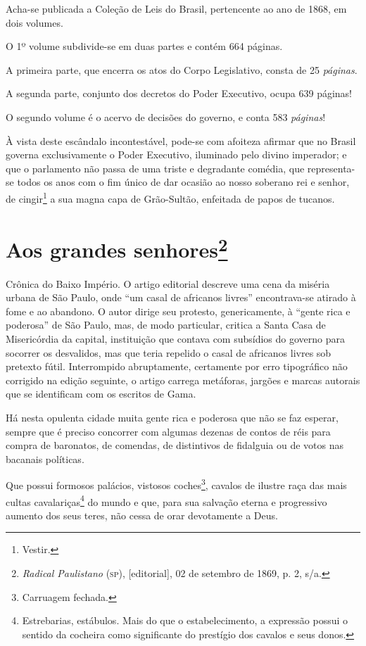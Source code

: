 Acha-se publicada a Coleção de Leis do Brasil, pertencente ao ano de
1868, em dois volumes.

O 1º volume subdivide-se em duas partes e contém 664 páginas.

A primeira parte, que encerra os atos do Corpo Legislativo, consta de 25
\emph{páginas}.

A segunda parte, conjunto dos decretos do Poder Executivo, ocupa 639
páginas!

O segundo volume é o acervo de decisões do governo, e conta 583
\emph{páginas}!

À vista deste escândalo incontestável, pode-se com afoiteza afirmar que
no Brasil governa exclusivamente o Poder Executivo, iluminado pelo
divino imperador; e que o parlamento não passa de uma triste e
degradante comédia, que representa-se todos os anos com o fim único de
dar ocasião ao nosso soberano rei e senhor, de cingir\footnote{Vestir.}
a sua magna capa de Grão-Sultão, enfeitada de papos de tucanos.

\chapter{Aos grandes senhores\footnote{\emph{Radical Paulistano} (\textsc{sp}),
  {[}editorial{]}, 02 de setembro de 1869, p. 2, s/a.}}

\begin{didascalia}
Crônica do Baixo Império. O artigo editorial descreve uma cena da
miséria urbana de São Paulo, onde ``um casal de africanos livres''
encontrava-se atirado à fome e ao abandono. O autor dirige seu protesto,
genericamente, à ``gente rica e poderosa'' de São Paulo, mas, de modo
particular, critica a Santa Casa de Misericórdia da capital, instituição
que contava com subsídios do governo para socorrer os desvalidos, mas
que teria repelido o casal de africanos livres sob pretexto fútil.
Interrompido abruptamente, certamente por erro tipográfico não corrigido
na edição seguinte, o artigo carrega metáforas, jargões e marcas
autorais que se identificam com os escritos de Gama.
\end{didascalia}



Há nesta opulenta cidade muita gente rica e poderosa que não se faz
esperar, sempre que é preciso concorrer com algumas dezenas de contos de
réis para compra de baronatos, de comendas, de distintivos de fidalguia
ou de votos nas bacanais políticas.

Que possui formosos palácios, vistosos coches\footnote{Carruagem
  fechada.}, cavalos de ilustre raça das mais cultas
cavalariças\footnote{Estrebarias, estábulos. Mais do que o
  estabelecimento, a expressão possui o sentido da cocheira como
  significante do prestígio dos cavalos e seus donos.} do mundo e que,
para sua salvação eterna e progressivo aumento dos seus teres, não cessa
de orar devotamente a Deus.

